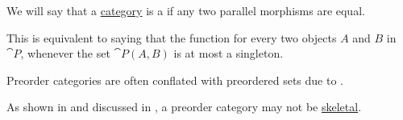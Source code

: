 \begin{definition}\label{def:preorder_category}
  We will say that a \hyperref[def:category]{category} is a  if any two parallel morphisms are equal.

  This is equivalent to saying that the function for every two objects \( A \) and \( B \) in \( \cat{P} \), whenever the set \( \cat{P}(A, B) \) is at most a singleton.
\end{definition}
\begin{comments}
  \item Preorder categories are often conflated with preordered sets due to .

  \item As shown in  and discussed in , a preorder category may not be \hyperref[def:skeletal_category]{skeletal}.
\end{comments}

